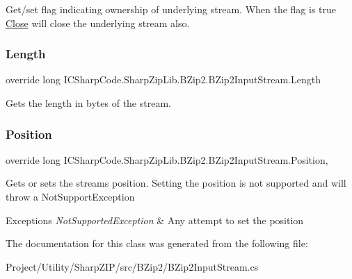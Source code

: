 Get/set flag indicating ownership of underlying stream. When the flag is true \hyperlink{class_i_c_sharp_code_1_1_sharp_zip_lib_1_1_b_zip2_1_1_b_zip2_input_stream_a6f1fff887e482b4f72fac6295b456f02}{Close} will close the underlying stream also. 

\mbox{\label{class_i_c_sharp_code_1_1_sharp_zip_lib_1_1_b_zip2_1_1_b_zip2_input_stream_ae1c38ac6eb9dfe655889f767306d7885}} 
\subsubsection{\texorpdfstring{Length}{Length}}
{\footnotesize\ttfamily override long I\+C\+Sharp\+Code.\+Sharp\+Zip\+Lib.\+B\+Zip2.\+B\+Zip2\+Input\+Stream.\+Length\hspace{0.3cm}{\ttfamily [get]}}



Gets the length in bytes of the stream. 

\mbox{\label{class_i_c_sharp_code_1_1_sharp_zip_lib_1_1_b_zip2_1_1_b_zip2_input_stream_a3a98577243a092ea9ca4ca13a7405295}} 
\subsubsection{\texorpdfstring{Position}{Position}}
{\footnotesize\ttfamily override long I\+C\+Sharp\+Code.\+Sharp\+Zip\+Lib.\+B\+Zip2.\+B\+Zip2\+Input\+Stream.\+Position\hspace{0.3cm}{\ttfamily [get]}, {\ttfamily [set]}}



Gets or sets the streams position. Setting the position is not supported and will throw a Not\+Support\+Exception 


\begin{DoxyExceptions}{Exceptions}
{\em Not\+Supported\+Exception} & Any attempt to set the position\\
\hline
\end{DoxyExceptions}


The documentation for this class was generated from the following file\+:\begin{DoxyCompactItemize}
\item 
Project/\+Utility/\+Sharp\+Z\+I\+P/src/\+B\+Zip2/B\+Zip2\+Input\+Stream.\+cs\end{DoxyCompactItemize}
